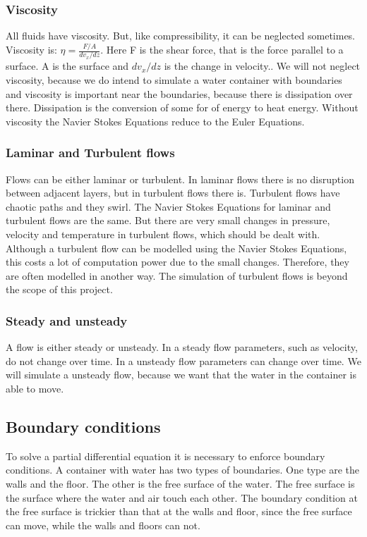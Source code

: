 \documentclass{article}
\begin{document}
\subsubsection{Viscosity}
All fluids have viscosity. But, like compressibility, it can be neglected sometimes. Viscosity is: \(\eta=\frac{F/A}{dv_{x}/dz }\). Here F is the shear force, that is the force parallel to a surface. A is the surface and \(dv_{x}/dz\) is the change in velocity.\cite{Viscosity}. We will not neglect viscosity, because we do intend to simulate a water container with boundaries and viscosity is important near the boundaries, because there is dissipation over there.\cite{NSE features} Dissipation is the conversion of some for of energy to heat energy\cite{Dissipation}. Without viscosity the Navier Stokes Equations reduce to the Euler Equations\cite{NSE features}.

\subsubsection{Laminar and Turbulent flows}
Flows can be either laminar or turbulent\cite{NSE features}. In laminar flows there is no disruption between adjacent layers, but in turbulent flows there is. Turbulent flows have chaotic paths and they swirl. The Navier Stokes Equations for laminar and turbulent flows are the same. But there are very small changes in pressure, velocity and temperature in turbulent flows, which should be dealt with. Although a turbulent flow can be modelled using the Navier Stokes Equations, this costs a lot of computation power due to the small changes.\cite{Turbulence} Therefore, they are often modelled in another way. The simulation of turbulent flows is beyond the scope of this project.

\subsubsection{Steady and unsteady} \label{(un)steady}
A flow is either steady or unsteady\cite{NSE features}. In a steady flow parameters, such as velocity, do not change over time. In a unsteady flow parameters can change over time.\cite{Steady and unsteady} We will simulate a unsteady flow, because we want that the water in the container is able to move.


\subsection{Boundary conditions}
To solve a partial differential equation it is necessary to enforce boundary conditions. A container with water has two types of boundaries. One type are the walls and the floor. The other is the free surface of the water. The free surface is the surface where the water and air touch each other. The boundary condition at the free surface is trickier than that at the walls and floor, since the free surface can move, while the walls and floors can not. 
\end{document}
